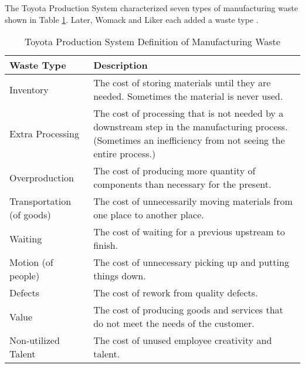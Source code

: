 The Toyota Production System characterized seven types of manufacturing waste \cite{ShingoToyotaProductionSystem} shown in Table \ref{ManufacturingWaste}. Later, Womack and Liker each added a waste type \cite{WomackLeanThinking, LikerToyotaWay}.

\begin{table}[t]
\renewcommand{\arraystretch}{1.5}
\centering
\caption{Toyota Production System Definition of Manufacturing Waste}
\label{ManufacturingWaste}
\begin{tabular}{|p{0.85in}|p{2.3in}|}
\hline

Waste Type                & Description                                                                                                                                                  \\ \hline
Inventory                 & The cost of storing materials until they are needed. Sometimes the material is never used.                                                                   \\ \hline
Extra Processing          & The cost of processing that is not needed by a downstream step in the manufacturing process. (Sometimes an inefficiency from not seeing the entire process.) \\ \hline
Overproduction            & The cost of producing more quantity of components than necessary for the present.                                                                            \\ \hline
Transportation (of goods) & The cost of unnecessarily moving materials from one place to another place.                                                                                  \\ \hline
Waiting                   & The cost of waiting for a previous upstream to finish.                                                                                                       \\ \hline
Motion (of people)        & The cost of unnecessary picking up and putting things down.                                                                                                  \\ \hline
Defects                   & The cost of rework from quality defects.                                                                                                                     \\ \hline
Value                     & The cost of producing goods and services that do not meet the needs of the customer.                                                                         \\ \hline
Non-utilized Talent       & The cost of unused employee creativity and talent.                                                                                                           \\ \hline
\end{tabular}
\end{table}

